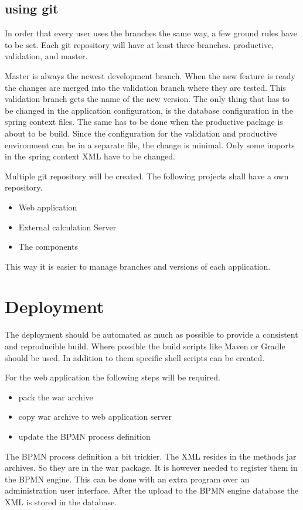 \documentclass[paper=a4,twoside=false,BCOR=0mm,DIV=calc,fontsize=12pt]{scrartcl}
\begin{document}
\subsection{using git}
In order that every user uses the branches the same way, a few ground rules have to be set.
Each git repository will have at least three branches. productive, validation, and master.

Master is always the newest development branch. When the new feature is ready the changes are merged into the validation branch where they are tested. This validation branch gets the name of the new version.
The only thing that has to be changed in the application configuration, is the database configuration in the spring context files.
The same has to be done when the productive package is about to be build. Since the configuration for the validation and productive 
environment can be in a separate file, the change is minimal. Only some imports in the spring context XML have to be changed.

Multiple git repository will be created. The following projects shall have a own repository.
\begin{itemize}
 \item Web application
 \item External calculation Server
 \item The components
\end{itemize}

This way it is easier to manage branches and versions of each application.



\section{Deployment}
The deployment should be automated as much as possible to provide a consistent and reproducible build.
Where possible the build scripts like Maven or Gradle should be used. 
In addition to them specific shell scripts can be created.

For the web application the following steps will be required.
\begin{itemize}
 \item pack the war archive
 \item copy war archive to web application server
 \item update the BPMN process definition
\end{itemize}

The BPMN process definition a bit trickier. The XML resides in the methods jar archives. So they are in the war package. It is however needed to register them in the BPMN engine. 
This can be done with an extra program over an administration user interface. After the upload to the BPMN engine database the XML is stored in the database.
\end{document}

